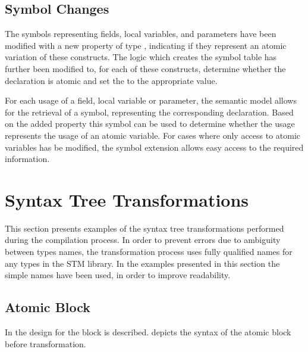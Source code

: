 \subsection{Symbol Changes}
The symbols representing fields, local variables, and parameters have been modified with a new  property of type , indicating if they represent an atomic variation of these constructs. The logic which creates the symbol table has further been modified to, for each of these constructs, determine whether the declaration is atomic and set the  to the appropriate value.

For each usage of a field, local variable or parameter, the semantic model allows for the retrieval of a symbol, representing the corresponding declaration. Based on the added  property this symbol can be used to determine whether the usage represents the usage of an atomic variable. For cases where only access to atomic variables has be modified, the symbol extension allows easy access to the required information.

\section{Syntax Tree Transformations}
\label{sec:syntax_tree_transformations}
This section presents examples of the syntax tree transformations performed during the compilation process. In order to prevent errors due to ambiguity between types names, the transformation process uses fully qualified names\cite[p. 73]{csharp2013specificaiton}  for any types in the \ac{STM} library. In the examples presented in this section the simple names have been used, in order to improve readability. 

\subsection{Atomic Block}
In  the design for the  block is described.  depicts the syntax of the atomic block before transformation. 

